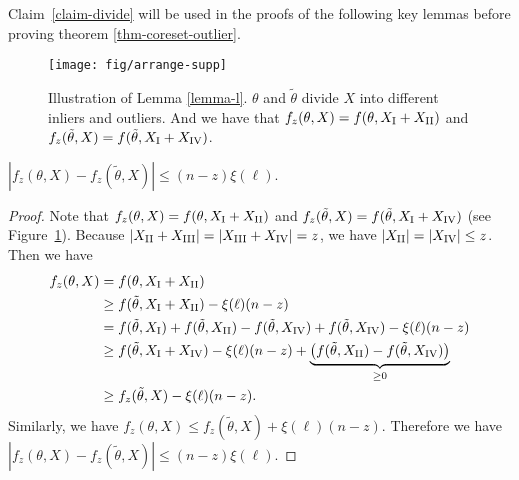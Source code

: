 Claim~\ref{claim-divide} will be used in the proofs of the following key lemmas before proving theorem \ref{thm-coreset-outlier}.

\begin{figure}
	\centering
	\texttt{[image: fig/arrange-supp]}
	\caption{Illustration of Lemma \ref{lemma-l}. $\theta$ and $ \tilde{\theta} $ divide $X$ into different inliers and outliers. And we have that $ f_z(\theta,X)= f(\theta,X_\mathrm{\Rnum{1}}+X_\mathrm{\Rnum{2}}) $ and $ f_z(\tilde{\theta},X)= f(\tilde{\theta},X_\mathrm{\Rnum{1}}+X_\mathrm{\Rnum{4}}) $. }
	\label{fig:region-2}
\end{figure}

\begin{lemma}\label{lemma-l}
		$\left| f_z(\theta,X)-f_z(\tilde{\theta},X) \right|\leq (n-z)\xi(\ell).$
\end{lemma}


\begin{proof}
	Note that $ f_z(\theta,X)= f(\theta,X_\mathrm{\Rnum{1}}+X_\mathrm{\Rnum{2}}) $ and $ f_z(\tilde{\theta},X)= f(\tilde{\theta},X_\mathrm{\Rnum{1}}+X_\mathrm{\Rnum{4}})$ (see Figure~\ref{fig:region-2}). 
	Because $ |X_\mathrm{\Rnum{2}}+X_\mathrm{\Rnum{3}}|=|X_\mathrm{\Rnum{3}}+X_\mathrm{\Rnum{4}}|=z $, we have $ |X_\mathrm{\Rnum{2}}|=|X_\mathrm{\Rnum{4}}|\leq z $. 
	Then we have 
	\begin{align*}
		f_z(\theta,X)&=f(\theta,X_\mathrm{\Rnum{1}}+X_\mathrm{\Rnum{2}})\\ &\geq f(\tilde{\theta},X_\mathrm{\Rnum{1}}+X_\mathrm{\Rnum{2}})-\xi(\ell)(n-z)\\ &=f(\tilde{\theta},X_\mathrm{\Rnum{1}})+f(\tilde{\theta},X_\mathrm{\Rnum{2}})-f(\tilde{\theta},X_\mathrm{\Rnum{4}})+f(\tilde{\theta},X_\mathrm{\Rnum{4}})-\xi(\ell)(n-z)\\
		&\geq f(\tilde{\theta},X_\mathrm{\Rnum{1}}+X_\mathrm{\Rnum{4}})-\xi(\ell)(n-z)+\underbrace{\left( f(\tilde{\theta},X_\mathrm{\Rnum{2}})-f(\tilde{\theta},X_\mathrm{\Rnum{4}}) \right)}_{\geq 0} \\
		&\geq f_z(\tilde{\theta},X)-\xi(\ell)(n-z).
	\end{align*}
	Similarly, we have $ f_z(\theta,X)\leq f_z(\tilde{\theta},X)+\xi(\ell)(n-z) $. Therefore we have 	$\left| f_z(\theta,X)-f_z(\tilde{\theta},X) \right|\leq (n-z)\xi(\ell).$
\end{proof}


